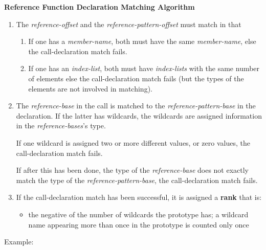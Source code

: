 \documentclass[12pt]{article}
\newcommand{\key}[1]{{\rm \bfseries #1}}
\begin{document}
\centerline{\bf Reference Function Declaration Matching Algorithm}
\begin{enumerate}
\item\label{REFERENCE-CALL-REFERENCE-DECLARATION-OFFSET-MATCHING}
The {\em reference-offset} and the {\em  reference-pattern-offset} must
match in that
\begin{enumerate}
\item
If one has a {\em member-name}, both must have the same {\em member-name},
else the call-declaration match fails.
\item
If one has an {\em index-list}, both must have {\em index-lists}
with the same number of elements
else the call-declaration match fails
(but the types of the elements are not involved in matching).
\end{enumerate}

\item\label{REFERENCE-CALL-DECLARATION-ARGUMENT-MATCHING}
The {\em reference-base} in the call is matched to the
{\em reference-pattern-base} in the declaration.
If the latter has wildcards, the wildcards are assigned
information in the {\em reference-bases}'s type.

If one wildcard is assigned two or more different values, or zero values,
the call-declaration match fails.

If after this has been done, the type of the {\em reference-base}
does not exactly match the type of the {\em reference-pattern-base},
the call-declaration match fails.

\item\label{REFERENCE-CALL-DECLARATION-RANK-COMPUTATION}
If the call-declaration match has been successful, it is assigned
a \key{rank} that is:
\begin{itemize}
\item the negative of the number of wildcards
the prototype has; a wildcard name appearing more than once in
the prototype is counted only once
\end{itemize}

\end{enumerate}


Example:
\end{document}
